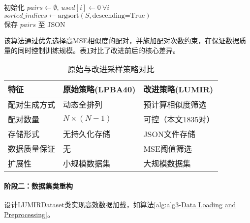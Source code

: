 \begin{algorithm}[h]
    \label{alg:alg2-Similarity-based Image Pairing}
    初始化 $pairs \gets \emptyset$, $used[i] \gets 0\ \forall i$ \\
    $sorted\_indices \gets \text{argsort}(S, \text{descending=True})$ \\
    保存 $pairs$ 至 JSON \\
\end{algorithm}

该算法通过优先选择高MSE相似度的配对，并施加配对次数约束，在保证数据质量的同时控制训练规模。表\ref{tab1}对比了改进前后的核心差异。

\begin{table}[!h]
    \centering
    \caption{原始与改进采样策略对比}
    \label{tab1}
    \begin{tabular}{lll}
        \toprule
        \textbf{特征} & \textbf{原始策略(LPBA40)} & \textbf{改进策略(LUMIR)} \\
        \midrule
        配对生成方式      & 动态全排列                 & 预计算相似度筛选             \\
        配对数量        & $N \times (N-1)$      & 可控（本文1835对）          \\
        存储形式        & 无持久化存储                & JSON文件存储             \\
        数据质量保证      & 无                     & MSE阈值筛选              \\
        扩展性         & 小规模数据集                & 大规模数据集               \\
        \bottomrule
    \end{tabular}
\end{table}



\paragraph{阶段二：数据集类重构}
设计LUMIRDataset类实现高效数据加载，如算法\ref{alg:alg3-Data Loading and Preprocessing}。

